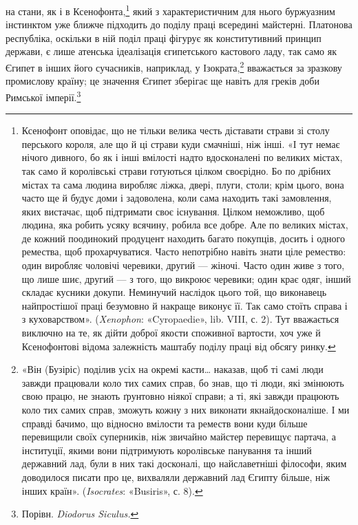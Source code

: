 на стани, як і в Ксенофонта,\footnote{
Ксенофонт оповідає, що не тільки велика честь діставати страви
зі столу перського короля, але що й ці страви куди смачніші, ніж інші.
«І тут немає нічого дивного, бо як і інші вмілості надто вдосконалені по
великих містах, так само й королівські страви готуються цілком своєрідно.
Бо по дрібних містах та сама людина виробляє ліжка, двері, плуги, столи;
крім цього, вона часто ще й будує доми і задоволена, коли сама находить
такі замовлення, яких вистачає, щоб підтримати своє існування.
Цілком неможливо, щоб людина, яка робить усяку всячину, робила
все добре. Але по великих містах, де кожний поодинокий продуцент
находить багато покупців, досить і одного ремества, щоб прохарчуватися.
Часто непотрібно навіть знати ціле ремество: один виробляє чоловічі
черевики, другий — жіночі. Часто один живе з того, що лише шиє, другий
— з того, що викроює черевики; один крає одяг, інший складає кусники
докупи. Неминучий наслідок цього той, що виконавець найпростішої
праці безумовно й накраще виконує її. Так само стоїть справа і
з куховарством». (\emph{Xenophon}: «Cyropaedie», lib. VIII, с. 2). Тут вважається
виключно на те, як дійти доброї якости споживної вартости,
хоч уже й Ксенофонтові відома залежність маштабу поділу праці від
обсягу ринку.
} який з характеристичним для
нього буржуазним інстинктом уже ближче підходить до поділу
праці всередині майстерні. Платонова республіка, оскільки в ній
поділ праці фігурує як конститутивний принцип держави, є
лише атенська ідеалізація єгипетського кастового ладу, так само
як Єгипет в інших його сучасників, наприклад, у Ізократа,\footnote{
«Він (Бузіріс) поділив усіх на окремі касти\dots{} наказав, щоб ті
самі люди завжди працювали коло тих самих справ, бо знав, що ті люди,
які змінюють свою працю, не знають ґрунтовно ніякої справи; а ті, які
завжди працюють коло тих самих справ, зможуть кожну з них виконати
якнайдосконаліше. І ми справді бачимо, що відносно вмілости та реместв
вони куди більше перевищили своїх суперників, ніж звичайно майстер
перевищує партача, а інституції, якими вони підтримують королівське
панування та інший державний лад, були в них такі досконалі, що найславетніші
філософи, яким доводилося писати про це, вихваляли державний
лад Єгипту більше, ніж інших країн». (\emph{Isocrates}: «Busiris», с. 8).
}
вважається за зразкову промислову країну; це значення Єгипет
зберігає ще навіть для греків доби Римської імперії.\footnote{
Порівн. \emph{Diodorus Siculus.}
}

